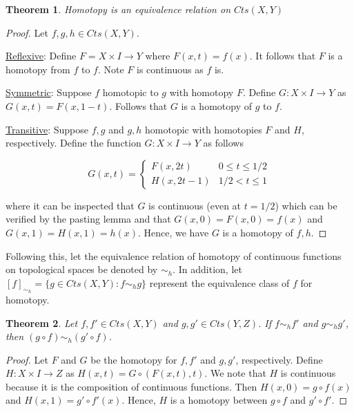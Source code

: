 \documentclass{article}
\newtheorem{theorem}{Theorem}[section]
\theoremstyle{definition}
\begin{document}
\begin{theorem}
Homotopy is an equivalence relation on $Cts(X,Y)$
\end{theorem}
\begin{proof}
Let $f,g,h \in Cts(X,Y)$.

\underline{Reflexive}:
Define $F = X \times I \to Y$ where $F(x,t) = f(x)$. It follows that $F$ is a homotopy from $f$ to $f$. Note $F$ is continuous as $f$ is.

\underline{Symmetric}:
Suppose $f$ homotopic to $g$ with homotopy $F$. Define $G: X \times I \to Y$ as $G(x,t) = F(x,1-t)$. Follows that $G$ is a homotopy of $g$ to $f$.

\underline{Transitive}:
Suppose $f,g$ and $g,h$ homotopic with homotopies $F$ and $H$, respectively. Define the function $G: X \times I \to Y$ as follows

\begin{equation*}
    G(x,t) =
    \begin{cases}
    F(x,2t) & 0 \leq t \leq 1/2\\
    H(x,2t-1) & 1/2 < t \leq 1
    \end{cases}
\end{equation*}

where it can be inspected that $G$ is continuous (even at $t=1/2$) which can be verified by the pasting lemma and that $G(x,0)=F(x,0)=f(x)$ and $G(x,1)=H(x,1)=h(x)$. Hence, we have $G$ is a homotopy of $f,h$.
\end{proof}

Following this, let the equivalence relation of homotopy of continuous functions on topological spaces be denoted by $\sim_{h}$. In addition, let $[f]_{\sim_{h}} = \{g \in Cts(X,Y) : f \sim_{h} g\}$ represent the equivalence class of $f$ for homotopy.


\begin{theorem}
Let $f,f' \in Cts(X,Y)$ and $g,g' \in Cts (Y,Z)$. If $f \sim_{h} f'$ and $g \sim_{h} g'$, then $(g \circ f) \sim_{h} (g' \circ f)$.
\end{theorem}
\begin{proof}
Let $F$ and $G$ be the homotopy for $f,f'$ and $g,g'$, respectively. Define $H: X \times I \to Z$ as $H(x,t) = G \circ (F(x,t),t)$. We note that $H$ is continuous because it is the composition of continuous functions. Then $H(x,0) = g \circ f(x)$ and $H(x,1) = g' \circ f'(x)$. Hence, $H$ is a homotopy between $g \circ f$ and $g' \circ f'$.
\end{proof}
\end{document}
